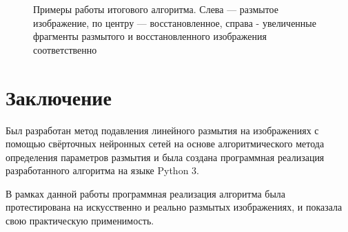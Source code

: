 \begin{figure}[H]
\caption{Примеры работы итогового алгоритма. Слева --- размытое изображение, по центру --- восстановленное, справа - увеличенные фрагменты размытого и восстановленного изображения соответственно}
\label{ris:res_ex}
\end{figure}

\newpage
\section{Заключение}
Был разработан метод подавления линейного размытия на изображениях с помощью свёрточных нейронных сетей на основе алгоритмического метода определения параметров размытия и была создана программная реализация разработанного алгоритма на языке Python 3.

В рамках данной работы программная реализация алгоритма была протестирована
на искусственно и реально размытых изображениях, и показала свою практическую применимость.


\newpage
\printbibliography[heading=bibintoc]

